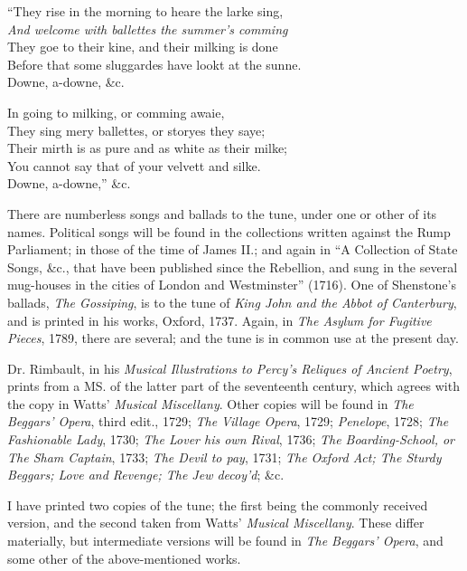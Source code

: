 \begin{scverse}
“They rise in the morning to heare the larke sing,\\
\textit{And welcome with ballettes the summer’s comming}\\
They goe to their kine, and their milking is done\\
Before that some sluggardes have lookt at the sunne.\\
\attribution Downe, a-downe, \&c.

In going to milking, or comming awaie,\\
They sing mery ballettes, or storyes they saye;\\
Their mirth is as pure and as white as their milke;\\
You cannot say that of your velvett and silke.\\
\attribution Downe, a-downe,” \&c.
\end{scverse}
\pagebreak

There are numberless songs and ballads to the tune, under one or other of its
names. Political songs will be found in the collections written against the Rump
Parliament; in those of the time of James II.; and again in “A Collection of
State Songs, \&c., that have been published since the Rebellion, and sung in the
several mug-houses in the cities of London and Westminster” (1716). One of
Shenstone’s ballads, \textit{The Gossiping}, is to the tune of \textit{King John and the Abbot of
Canterbury}, and is printed in his works, Oxford, 1737. Again, in \textit{The Asylum
for Fugitive Pieces}, 1789, there are several; and the tune is in common use at
the present day.

Dr. Rimbault, in his \textit{Musical Illustrations to Percy’s Reliques of Ancient
Poetry}, prints from a MS. of the latter part of the seventeenth century, which
agrees with the copy in Watts’ \textit{Musical Miscellany}. Other copies will be found
in \textit{The Beggars’ Opera}, third edit., 1729; \textit{The Village Opera}, 1729; \textit{Penelope},
1728; \textit{The Fashionable Lady}, 1730; \textit{The Lover his own Rival}, 1736; \textit{The
Boarding-School, or The Sham Captain}, 1733; \textit{The Devil to pay}, 1731; \textit{The
Oxford Act; The Sturdy Beggars; Love and Revenge; The Jew decoy’d}; \&c.

I have printed two copies of the tune; the first being the commonly received
version, and the second taken from Watts’ \textit{Musical Miscellany}. These differ
materially, but intermediate versions will be found in \textit{The Beggars’ Opera}, and
some other of the above-mentioned works.

